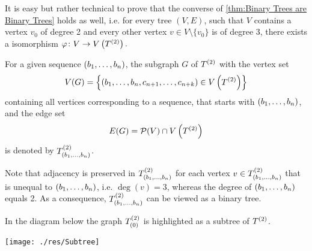 \begin{rem}
It is easy but rather technical to prove that the converse of \cref{thm:Binary Trees are Binary Trees} holds as well, i.e. for every tree $(V,E)$, such that $V$ contains a vertex $v_0$ of degree 2 and every other vertex $v\in V\setminus\lbrace v_0\rbrace$ is of degree 3, there exists a isomorphism $\varphi\colon V\to\VT.$ 
\end{rem}

\begin{defin}
For a given sequence $(\seq{b})$, the subgraph $G$ of $\T$ with the vertex set 
\begin{equation*}
V(G)=\left\lbrace (\seq[n]{b},c_{n+1},\ldots,c_{n+k})\in\VT \right\rbrace
\end{equation*}
containing all vertices corresponding to a sequence, that starts with $(\seq{b})$, and the edge set
\begin{equation*}
E(G)=\mathcal{P}(V)\cap \VT
\end{equation*}
is denoted by $\ST{(\seq{b})}$.
\end{defin}

Note that adjacency is preserved in $\ST{(\seq{b})}$ for each vertex $v\in\ST{(\seq{b})}$ that is unequal to $(\seq{b})$, i.e. $\deg(v)=3$, whereas the degree of $(\seq{b})$ equals 2. As a consequence, $\ST{(\seq{b})}$ can be viewed as a binary tree.

In the diagram below the graph $\ST{(0)}$ is highlighted as a subtree of $\T$.

\begin{center}
\texttt{[image: ./res/Subtree]}
%
%
\end{center}

